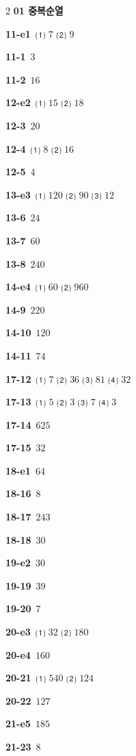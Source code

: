 \documentclass[10pt,a4paper]{article}
\begin{document}
\begin{multicols}{2}\small
\noindent\textbf{01 중복순열}\par\smallskip
\noindent\textbf{11-e1}\ ⑴ $7$ ⑵ $9$\par
\noindent\textbf{11-1}\ $3$\par
\noindent\textbf{11-2}\ $16$\par
\noindent\textbf{12-e2}\ ⑴ $15$ ⑵ $18$\par
\noindent\textbf{12-3}\ $20$\par
\noindent\textbf{12-4}\ ⑴ $8$ ⑵ $16$\par
\noindent\textbf{12-5}\ $4$\par
\noindent\textbf{13-e3}\ ⑴ $120$ ⑵ $90$ ⑶ $12$\par
\noindent\textbf{13-6}\ $24$\par
\noindent\textbf{13-7}\ $60$\par
\noindent\textbf{13-8}\ $240$\par
\noindent\textbf{14-e4}\ ⑴ $60$ ⑵ $960$\par
\noindent\textbf{14-9}\ $220$\par
\noindent\textbf{14-10}\ $120$\par
\noindent\textbf{14-11}\ $74$\par
\noindent\textbf{17-12}\ ⑴ $7$ ⑵ $36$ ⑶ $81$ ⑷ $32$\par
\noindent\textbf{17-13}\ ⑴ $5$ ⑵ $3$ ⑶ $7$ ⑷ $3$\par
\noindent\textbf{17-14}\ $625$\par
\noindent\textbf{17-15}\ $32$\par
\noindent\textbf{18-e1}\ $64$\par
\noindent\textbf{18-16}\ $8$\par
\noindent\textbf{18-17}\ $243$\par
\noindent\textbf{18-18}\ $30$\par
\noindent\textbf{19-e2}\ $30$\par
\noindent\textbf{19-19}\ $39$\par
\noindent\textbf{19-20}\ $7$\par
\noindent\textbf{20-e3}\ ⑴ $32$ ⑵ $180$\par
\noindent\textbf{20-e4}\ $160$\par
\noindent\textbf{20-21}\ ⑴ $540$ ⑵ $124$\par
\noindent\textbf{20-22}\ $127$\par
\noindent\textbf{21-e5}\ $185$\par
\noindent\textbf{21-23}\ $8$\par

\end{multicols}
\end{document}
